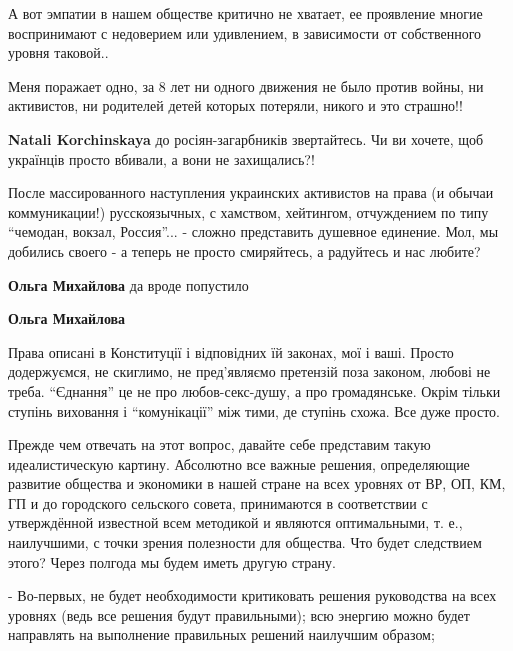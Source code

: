 \begin{itemize}
А вот эмпатии в нашем обществе критично не хватает, ее проявление многие
воспринимают с недоверием или удивлением, в зависимости от собственного уровня
таковой..



Меня поражает одно, за 8 лет ни одного движения не было против войны, ни
активистов, ни родителей детей которых потеряли, никого и это страшно!!

\begin{itemize} %
\textbf{Natali Korchinskaya} до росіян-загарбників звертайтесь. Чи ви хочете, щоб українців просто вбивали, а вони не захищались?!
\end{itemize} %


После массированного наступления украинских активистов на права (и обычаи
коммуникации!) русскоязычных, с хамством, хейтингом, отчуждением по типу
\enquote{чемодан, вокзал, Россия}... - сложно представить душевное единение. Мол, мы
добились своего - а теперь не просто смиряйтесь, а радуйтесь и нас любите?

\begin{itemize} %
\textbf{Ольга Михайлова} да вроде попустило

\textbf{Ольга Михайлова} 

Права описані в Конституції і відповідних їй законах, мої і ваші. Просто
додержуємся, не скиглимо, не пред'являємо претензій поза законом, любові не
треба. \enquote{Єднання} це не про любов-секс-душу, а про громадянське. Окрім тільки
ступінь виховання і \enquote{комунікації} між тими, де ступінь схожа. Все дуже просто.

\end{itemize} %


Прежде чем отвечать на этот вопрос, давайте себе представим такую
идеалистическую картину. Абсолютно все важные решения, определяющие развитие
общества и экономики в нашей стране на всех уровнях от ВР, ОП, КМ, ГП и до
городского сельского совета, принимаются в соответствии с утверждённой
известной всем методикой и являются оптимальными, т. е., наилучшими, с точки
зрения полезности для общества. Что будет следствием этого? Через полгода мы
будем иметь другую страну.

- Во-первых, не будет необходимости критиковать решения руководства на всех
уровнях (ведь все решения будут правильными); всю энергию можно будет
направлять на выполнение правильных решений наилучшим образом;


\end{itemize}
